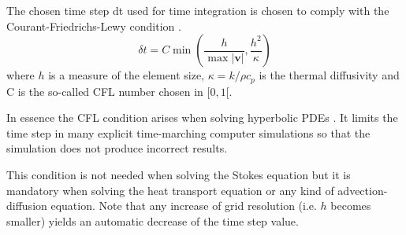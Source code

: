 The chosen time step dt used for time integration is chosen to
comply with the Courant-Friedrichs-Lewy condition \cite{cfd_anderson}.
\begin{equation}
\delta t = C \min \left( \frac{h}{\max |{\bm v}|} , \frac{h^2}{\kappa}  \right)
\end{equation}
where $h$ is a measure of the element size, $\kappa = k/ \rho c_p$ 
is the thermal diffusivity and C is the so-called CFL number chosen in $[0,1[$.

In essence the CFL condition arises when solving hyperbolic PDEs .
It limits the time step in many explicit time-marching computer simulations
so that the simulation does not produce incorrect results. 

This condition is not needed when solving the Stokes equation but it is mandatory 
when solving the heat transport equation or any kind of advection-diffusion equation. 
Note that any increase of grid resolution (i.e. $h$ becomes smaller) yields an automatic 
decrease of the time step value.






